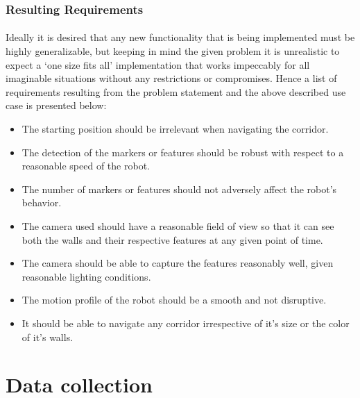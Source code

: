 \subsubsection*{Resulting Requirements}
\paragraph{} Ideally it is desired that any new functionality that is being implemented must be highly generalizable, but keeping in mind the given problem it is unrealistic to expect a `one size fits all' implementation that works impeccably for all imaginable situations without any restrictions or compromises. Hence a list of requirements resulting from the problem statement and the above described use case is presented below:

\begin{itemize}
	\item The starting position should be irrelevant when navigating the corridor.
	
	\item The detection of the markers or features should be robust with respect to a reasonable speed of the robot.
	
	\item The number of markers or features should not adversely affect the robot's behavior. 
	
	\item The camera used should have a reasonable field of view so that it can see both the walls and their respective features at any given point of time.
	
	\item The camera should be able to capture the features reasonably well, given reasonable lighting conditions.
	
	\item The motion profile of the robot should be a smooth and not disruptive. 
	
	\item It should be able to navigate any corridor irrespective of it's size or the color of it's walls.
\end{itemize}

\section{Data collection}
